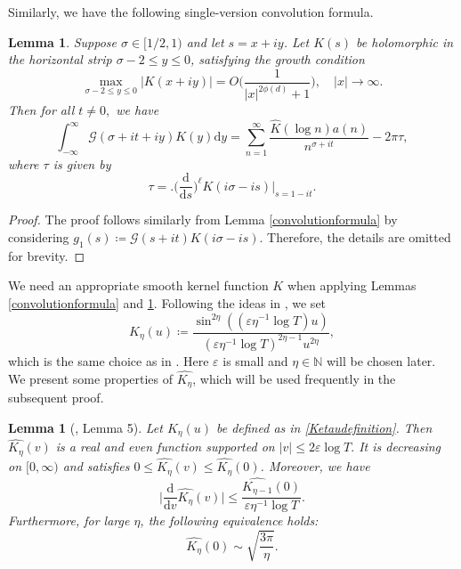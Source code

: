 \documentclass[12pt,reqno]{amsart}
\newtheorem{lem}[thm]{Lemma}
\theoremstyle{definition}
\numberwithin{equation}{section}
\newcommand{\inv}{^{-1}}
\newcommand{\mbn}{\mathbb{N}}
\newcommand{\mcg}{\mathcal{G}}
\begin{document}
Similarly, we have the following single-version convolution formula.
\begin{lem}
    	\label{singleconvolutionformula}
     Suppose $\sigma \in [1/2, 1)$ and let $s = x + iy$. Let $K(s)$ be holomorphic in the horizontal strip $\sigma-2 \le y \le 0$, satisfying the growth condition
     $$
     \max_{\sigma-2\le y \le 0}|K(x+iy)|= O \Big(\frac{1}{|x|^{2 \phi(d)} + 1}\Big), \quad |x|\to \infty.
     $$
     Then for all $t \neq 0,$ we have
     $$
     \int_{-\infty}^{\infty} \mcg(\sigma + it + iy)K(y)\mathrm{d}y = \sum_{n = 1}^{\infty} \frac{\widehat{K}(\log n) a(n)}{n^{\sigma + it} }  -  2\pi \tau,
     $$
     where $\tau$ is given by
       $$
       \tau = \Big. \Big( \frac{\mathrm{d}}{\mathrm{d}s} \Big)^{\ell}K(i\sigma - i s)  \Big|_{s = 1 - it}.
       $$
\end{lem}
\begin{proof}
     The proof follows similarly from Lemma \ref{convolutionformula} by considering $g_1(s) \coloneqq \mcg(s+it)K(i\sigma-is)$. Therefore, the details are omitted for brevity.
\end{proof}
We need an appropriate smooth kernel function $K$ when applying Lemmas \ref{convolutionformula} and \ref{singleconvolutionformula}. Following the ideas in \cite{bondarenko2023dichotomy,bondarenko2018argument}, we set 
\begin{equation}
\label{Ketaudefinition}
    K_{\eta}(u) \coloneqq \frac{\sin^{2\eta}((\varepsilon\eta\inv \log T)u)}{(\varepsilon\eta\inv\log T)^{2\eta - 1}u^{2\eta}},
\end{equation}
which is the same choice as in \cite{bondarenko2023dichotomy}. Here $\varepsilon$ is small and $\eta \in \mbn$ will be chosen later. We present some properties of $\widehat{K_\eta}$, which will be used frequently in the subsequent proof. 

\begin{lem}[\cite{bondarenko2023dichotomy}, Lemma 5]
   \label{Ketauproperties}
Let $K_{\eta}(u)$ be defined as in \eqref{Ketaudefinition}. Then $\widehat{K_{\eta}}(v)$ is a real and even function supported on $|v|\le 2\varepsilon\log T.$ 
It is decreasing on $[0,\infty)$ and satisfies $0\le\widehat{K_{\eta}}(v)\le\widehat{K_{\eta}}(0)$. Moreover, we have
\begin{equation}
\label{Ketahatderivatives}
\Big|\frac{\mathrm{d}}{\mathrm{d}v}\widehat{K_{\eta}}(v)\Big|\le\frac{\widehat{K_{\eta-1}}(0)}{\varepsilon\eta\inv\log T}.
\end{equation}
Furthermore, for large $\eta$, the following equivalence holds:
\begin{equation}
\label{Ketahatequivalence}
\widehat{K_{\eta}}(0)\sim\sqrt{\frac{3\pi}{\eta}}.
\end{equation}
\end{lem}
\end{document}
